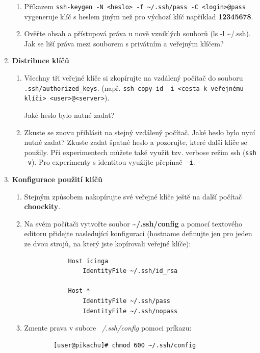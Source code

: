 \begin{enumerate}
\begin{enumerate}
      \item Příkazem {\tt ssh-keygen -N <heslo> -f \textasciitilde/.ssh/pass -C
        <login>@pass} vygeneruje klíč s heslem jiným než pro výchozí klíč například \textbf{12345678}.

      \item Ověřte obsah a přístupová práva u nově vzniklých souborů (ls -l \textasciitilde/.ssh). Jak
se liší práva mezi souborem s privátním a veřejným klíčem?

    \end{enumerate}

  \item {\bf Distribuce klíčů}

    \begin{enumerate}

      \item Všechny tři veřejné klíče si zkopírujte na vzdálený počítač do
        souboru \verb|.ssh/authorized_keys|.
        (např. {\verb&ssh-copy-id -i <cesta k veřejnému klíči> <user>@<server>&}).
        
      Jaké heslo bylo nutné zadat?

      \item Zkuste se znovu přihlásit na stejný vzdálený počítač. Jaké heslo bylo nyní nutné zadat? Zkuste
zadat špatné heslo a pozorujte, které další klíče se použily. Při experimentech můžete také
využít tzv. verbose režim ssh ({\tt ssh -v}). Pro experimenty s identitou
využijte přepínač~{\tt -i}.

    \end{enumerate}

  \item {\bf Konfigurace použití klíčů}

    \begin{enumerate}

      \item Stejným způsobem nakopírujte své veřejné klíče ještě na další počítač \textbf{choockity}.

      \item Na svém počítači vytvořte soubor \textbf{\textasciitilde/.ssh/config} a pomocí textového editoru přidejte
        nasledující konfiguraci (hostname definujte jen pro jeden ze dvou strojů, na který jste
        kopírovali veřejné klíče):
        \begin{verbatim}
            Host icinga
                IdentityFile ~/.ssh/id_rsa

            Host *
                IdentityFile ~/.ssh/pass
                IdentityFile ~/.ssh/nopass
        \end{verbatim}
    \item Zmente prava v subore \textit{~/.ssh/config} pomoci príkazu:
      \begin{lstlisting}
        [user@pikachu]# chmod 600 ~/.ssh/config
      \end{lstlisting}
    

\end{enumerate}
\end{enumerate}
